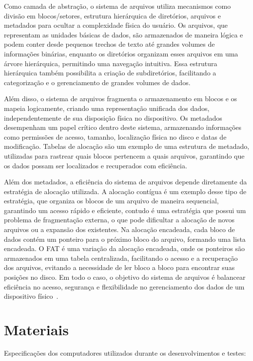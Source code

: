 \documentclass[
    12pt,				%
    oneside,   	        %
    a4paper,			%
    english,			%
    french,				%
    spanish,			%
    brazil,				%
    ]{pacotes/abntex2}
\begin{document}
Como camada de abstração, o sistema de arquivos utiliza mecanismos como divisão em blocos/setores, estrutura hierárquica de diretórios, arquivos e metadados para ocultar a complexidade física do usuário. Os arquivos, que representam as unidades básicas de dados, são armazenados de maneira lógica e podem conter desde pequenos trechos de texto até grandes volumes de informações binárias, enquanto os diretórios organizam esses arquivos em uma árvore hierárquica, permitindo uma navegação intuitiva. Essa estrutura hierárquica também possibilita a criação de subdiretórios, facilitando a categorização e o gerenciamento de grandes volumes de dados.

Além disso, o sistema de arquivos fragmenta o armazenamento em blocos e os mapeia logicamente, criando uma representação unificada dos dados, independentemente de sua disposição física no dispositivo. Os metadados desempenham um papel crítico dentro deste sistema, armazenando informações como permissões de acesso, tamanho, localização física no disco e datas de modificação. Tabelas de alocação são um exemplo de uma estrutura de metadado, utilizadas para rastrear quais blocos pertencem a quais arquivos, garantindo que os dados possam ser localizados e recuperados com eficiência.

Além dos metadados, a eficiência do sistema de arquivos depende diretamente da estratégia de alocação utilizada. A alocação contígua é um exemplo desse tipo de estratégia, que organiza os blocos de um arquivo de maneira sequencial, garantindo um acesso rápido e eficiente, contudo é uma estratégia que possui um problema de fragmentação externa, o que pode dificultar a alocação de novos arquivos ou a expansão dos existentes. Na alocação encadeada, cada bloco de dados contém um ponteiro para o próximo bloco do arquivo, formando uma lista encadeada. O FAT é uma variação da alocação encadeada, onde os ponteiros são armazenados em uma tabela centralizada, facilitando o acesso e a recuperação dos arquivos, evitando a necessidade de ler bloco a bloco para encontrar suas posições no disco. Em todo o caso, o objetivo do sistema de arquivos é balancear eficiência no acesso, segurança e flexibilidade no gerenciamento dos dados de um dispositivo físico~\cite{maziero2019}.

\section{Materiais}
\label{sec:materiais}

Especificações dos computadores utilizados durante os desenvolvimentos e testes:
\end{document}
